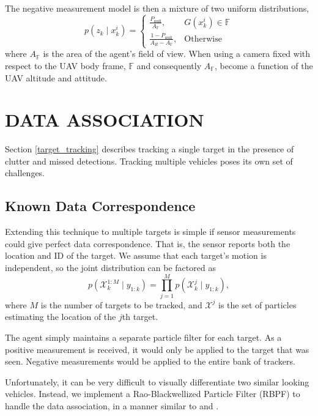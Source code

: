 \documentclass[letterpaper, 10 pt, conference]{ieeeconf}  %
\begin{document}
The negative measurement model is then a mixture of two uniform distributions,
\begin{equation}%
    p(z_k \mid x^i_k) = 
    \begin{cases}
        \frac{P_{\text{null}}}{A_{\mathbb{F}}}, \quad & G(x^i_k) \in \mathbb{F} \\
        \frac{1 - P_{\text{null}}}{A_R - A_{\mathbb{F}}}, & \text{Otherwise}
    \end{cases}
\end{equation}
where $A_{\mathbb{F}}$ is the area of the agent's field of view. When using a camera fixed with respect to the UAV body frame, $\mathbb{F}$ and consequently $A_{\mathbb{F}}$, become a function of the UAV altitude and attitude.

\section{DATA ASSOCIATION}\label{data_association}

Section \ref{target_tracking} describes tracking a single target in the presence of clutter and missed detections. Tracking multiple vehicles poses its own set of challenges.

\subsection{Known Data Correspondence}

Extending this technique to multiple targets is simple if sensor measurements could give perfect data correspondence. That is, the sensor reports both the location and ID of the target. We assume that each target's motion is independent, so the joint distribution can be factored as
\begin{equation}\label{eq:oracle_trackers}
    p(\mathcal{X}^{1:M}_{k} \mid y_{1:k}) = \prod_{j=1}^M p(\mathcal{X}^{j}_{k} \mid y_{1:k}),
\end{equation}
where $M$ is the number of targets to be tracked, and $\mathcal{X}^j$ is the set of particles estimating the location of the $j$th target.

The agent simply maintains a separate particle filter for each target. As a positive measurement is received, it would only be applied to the target that was seen. Negative measurements would be applied to the entire bank of trackers.

Unfortunately, it can be very difficult to visually differentiate two similar looking vehicles. Instead, we implement a Rao-Blackwellized Particle Filter (RBPF) to handle the data association, in a manner similar to \cite{Ahmed2017} and \cite{Sarkka2007}.
\end{document}
